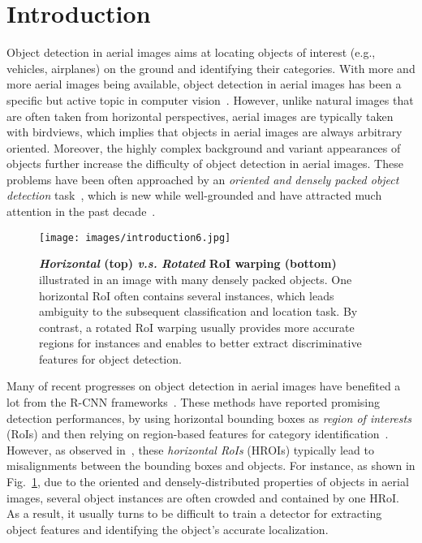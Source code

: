 \documentclass[11pt,onecolumn]{article}         \usepackage[top=3.6cm, bottom=3.2cm, left=2.3cm, right=2.3cm]{geometry}
\begin{document}
\section{Introduction}
Object detection in aerial images aims at locating objects of interest (e.g., vehicles, airplanes) on the ground and identifying their categories. With more and more aerial images being available, object detection in aerial images has been a specific but active topic in computer vision~\cite{roatation-invariant-cvpr,long2017accurate,rotation-invariant, deng2017toward}. However, unlike natural images that are often taken from horizontal perspectives, aerial images are typically taken with birdviews, which implies that objects in aerial images are always arbitrary oriented.
Moreover, the highly complex background and variant appearances of objects further increase the difficulty of object detection in aerial images.  
These problems have been often approached by an {\em oriented and densely packed object detection} task~\cite{DOTA, VEDAI, drone}, which is new while well-grounded and have attracted much attention in the past decade~\cite{SRBBS, RRPN, RRCNN, textboxes++, azimi2018towards}.
\begin{figure}[t!]
    \centering
    \texttt{[image: images/introduction6.jpg]}
    \vspace{1mm}
    \caption{{\bf {\em Horizontal} (top) {\em v.s.} {\em Rotated} RoI warping (bottom)} illustrated in an image with many densely packed objects.
    One horizontal RoI often contains several instances,  which leads ambiguity to the subsequent classification and location task. By contrast, a rotated RoI warping usually provides more accurate regions for instances and enables to better extract discriminative features for object detection.
    }
    \label{fig:RoIvsRRoI}
\end{figure}

Many of recent progresses on object detection in aerial images have benefited a lot from the R-CNN frameworks~\cite{r-cnn,Fast_RCNN,FasterR-CNN,VHR,long2017accurate,xiao2017airport,deng2017toward,drone,li2017object}.
These methods have reported promising detection performances, by using horizontal bounding boxes as {\em region of interests} (RoIs) and then relying on region-based features for category identification~\cite{VHR, long2017accurate, deng2017toward}. 
However, as observed in~\cite{DOTA, HRSC2016}, these {\em horizontal RoIs} (HROIs) typically lead to misalignments between the bounding boxes and objects. 
For instance, as shown in Fig.~\ref{fig:RoIvsRRoI}, due to the oriented and densely-distributed properties of objects in aerial images, several object instances are often crowded and contained by one HRoI. 
As a result, it usually turns to be difficult to train a detector for extracting object features and identifying the object's accurate localization. 
\end{document}
